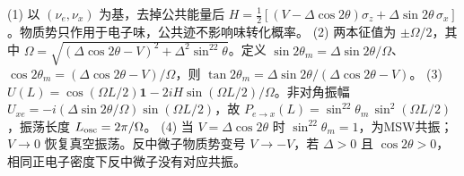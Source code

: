 (1) 以 \((\nu_e,\nu_x)\) 为基，去掉公共能量后 \(H=\frac12[(V-\Delta\cos2\theta)\sigma_z+\Delta\sin2\theta\,\sigma_x]\)。物质势只作用于电子味，公共迹不影响味转化概率。
(2) 两本征值为 \(\pm\Omega/2\)，其中 \(\Omega=\sqrt{(\Delta\cos2\theta-V)^2+\Delta^2\sin^22\theta}\)。定义 \(\sin2\theta_m=\Delta\sin2\theta/\Omega\)、\(\cos2\theta_m=(\Delta\cos2\theta-V)/\Omega\)，则 \(\tan2\theta_m=\Delta\sin2\theta/(\Delta\cos2\theta-V)\)。
(3) \(U(L)=\cos(\Omega L/2)\mathbf1-2iH\sin(\Omega L/2)/\Omega\)。非对角振幅 \(U_{xe}=-i(\Delta\sin2\theta/\Omega)\sin(\Omega L/2)\)，故 \(P_{e\to x}(L)=\sin^22\theta_m\,\sin^2(\Omega L/2)\)，振荡长度 \(L_{\rm osc}=2\pi/\Omega\)。
(4) 当 \(V=\Delta\cos2\theta\) 时 \(\sin^22\theta_m=1\)，为MSW共振；\(V\to0\) 恢复真空振荡。反中微子物质势变号 \(V\to-V\)，若 \(\Delta>0\) 且 \(\cos2\theta>0\)，相同正电子密度下反中微子没有对应共振。
